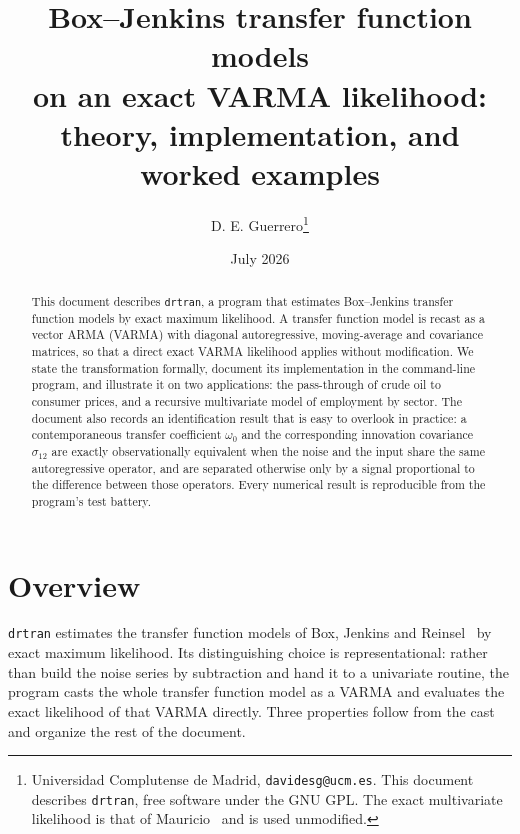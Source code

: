 \documentclass[11pt,a4paper]{article}
\title{\bfseries Box--Jenkins transfer function models\\
       on an exact VARMA likelihood:\\[2pt]
       \large theory, implementation, and worked examples}
\author{D. E. Guerrero\thanks{Universidad Complutense de Madrid,
        \texttt{davidesg@ucm.es}. This document describes \texttt{drtran}, free
        software under the GNU GPL. The exact multivariate likelihood is that of
        Mauricio~\cite{mauricio1997} and is used unmodified.}}
\date{July 2026}
\theoremstyle{plain}
\theoremstyle{remark}
\begin{document}
\maketitle

\begin{abstract}
\noindent
This document describes \texttt{drtran}, a program that estimates Box--Jenkins
transfer function models by exact maximum likelihood. A transfer function model
is recast as a vector ARMA (VARMA) with diagonal autoregressive, moving-average
and covariance matrices, so that a direct exact VARMA likelihood applies without
modification. We state the transformation formally, document its implementation
in the command-line program, and illustrate it on two applications: the
pass-through of crude oil to consumer prices, and a recursive multivariate model
of employment by sector. The document also records an identification result that
is easy to overlook in practice: a contemporaneous transfer coefficient
$\omega_0$ and the corresponding innovation covariance $\sigma_{12}$ are exactly
observationally equivalent when the noise and the input share the same
autoregressive operator, and are separated otherwise only by a signal
proportional to the difference between those operators. Every numerical result
is reproducible from the program's test battery.
\end{abstract}

\section{Overview}
\label{sec:overview}

\texttt{drtran} estimates the transfer function models of
Box, Jenkins and Reinsel~\cite[chs.~10--11]{bjr1994} by exact maximum
likelihood. Its distinguishing choice is representational: rather than build the
noise series by subtraction and hand it to a univariate routine, the program
casts the whole transfer function model as a VARMA and evaluates the exact
likelihood of that VARMA directly. Three properties follow from the cast and
organize the rest of the document.
\end{document}
